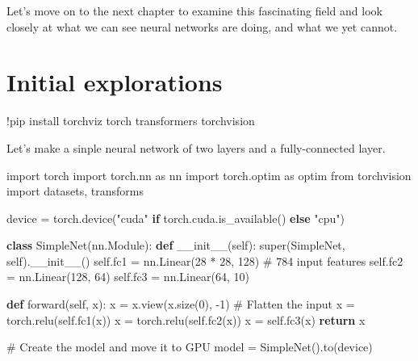 \documentclass[
  letterpaper,
  DIV=11,
  numbers=noendperiod]{scrreprt}
\newenvironment{Shaded}{\begin{snugshade}}{\end{snugshade}}
\newcommand{\BuiltInTok}[1]{\textcolor[rgb]{0.00,0.23,0.31}{#1}}
\newcommand{\CommentTok}[1]{\textcolor[rgb]{0.37,0.37,0.37}{#1}}
\newcommand{\ControlFlowTok}[1]{\textcolor[rgb]{0.00,0.23,0.31}{\textbf{#1}}}
\newcommand{\DecValTok}[1]{\textcolor[rgb]{0.68,0.00,0.00}{#1}}
\newcommand{\FunctionTok}[1]{\textcolor[rgb]{0.28,0.35,0.67}{#1}}
\newcommand{\ImportTok}[1]{\textcolor[rgb]{0.00,0.46,0.62}{#1}}
\newcommand{\KeywordTok}[1]{\textcolor[rgb]{0.00,0.23,0.31}{\textbf{#1}}}
\newcommand{\NormalTok}[1]{\textcolor[rgb]{0.00,0.23,0.31}{#1}}
\newcommand{\OperatorTok}[1]{\textcolor[rgb]{0.37,0.37,0.37}{#1}}
\newcommand{\StringTok}[1]{\textcolor[rgb]{0.13,0.47,0.30}{#1}}
\newcommand{\VariableTok}[1]{\textcolor[rgb]{0.07,0.07,0.07}{#1}}
\begin{document}
Let's move on to the next chapter to examine this fascinating field and
look closely at what we can see neural networks are doing, and what we
yet cannot.


\chapter{Initial explorations}\label{initial-explorations}

\begin{Shaded}
\begin{Highlighting}[]
\OperatorTok{!}\NormalTok{pip install torchviz torch transformers torchvision}
\end{Highlighting}
\end{Shaded}

Let's make a sinple neural network of two layers and a fully-connected
layer.

\begin{Shaded}
\begin{Highlighting}[]
\ImportTok{import}\NormalTok{ torch}
\ImportTok{import}\NormalTok{ torch.nn }\ImportTok{as}\NormalTok{ nn}
\ImportTok{import}\NormalTok{ torch.optim }\ImportTok{as}\NormalTok{ optim}
\ImportTok{from}\NormalTok{ torchvision }\ImportTok{import}\NormalTok{ datasets, transforms}

\NormalTok{device }\OperatorTok{=}\NormalTok{ torch.device(}\StringTok{"cuda"} \ControlFlowTok{if}\NormalTok{ torch.cuda.is\_available() }\ControlFlowTok{else} \StringTok{"cpu"}\NormalTok{)}

\KeywordTok{class}\NormalTok{ SimpleNet(nn.Module):}
    \KeywordTok{def} \FunctionTok{\_\_init\_\_}\NormalTok{(}\VariableTok{self}\NormalTok{):}
        \BuiltInTok{super}\NormalTok{(SimpleNet, }\VariableTok{self}\NormalTok{).}\FunctionTok{\_\_init\_\_}\NormalTok{()}
        \VariableTok{self}\NormalTok{.fc1 }\OperatorTok{=}\NormalTok{ nn.Linear(}\DecValTok{28} \OperatorTok{*} \DecValTok{28}\NormalTok{, }\DecValTok{128}\NormalTok{)  }\CommentTok{\# 784 input features}
        \VariableTok{self}\NormalTok{.fc2 }\OperatorTok{=}\NormalTok{ nn.Linear(}\DecValTok{128}\NormalTok{, }\DecValTok{64}\NormalTok{)}
        \VariableTok{self}\NormalTok{.fc3 }\OperatorTok{=}\NormalTok{ nn.Linear(}\DecValTok{64}\NormalTok{, }\DecValTok{10}\NormalTok{)}

    \KeywordTok{def}\NormalTok{ forward(}\VariableTok{self}\NormalTok{, x):}
\NormalTok{        x }\OperatorTok{=}\NormalTok{ x.view(x.size(}\DecValTok{0}\NormalTok{), }\OperatorTok{{-}}\DecValTok{1}\NormalTok{)  }\CommentTok{\# Flatten the input}
\NormalTok{        x }\OperatorTok{=}\NormalTok{ torch.relu(}\VariableTok{self}\NormalTok{.fc1(x))}
\NormalTok{        x }\OperatorTok{=}\NormalTok{ torch.relu(}\VariableTok{self}\NormalTok{.fc2(x))}
\NormalTok{        x }\OperatorTok{=} \VariableTok{self}\NormalTok{.fc3(x)}
        \ControlFlowTok{return}\NormalTok{ x}

\CommentTok{\# Create the model and move it to GPU}
\NormalTok{model }\OperatorTok{=}\NormalTok{ SimpleNet().to(device)}
\end{Highlighting}
\end{Shaded}
\end{document}
